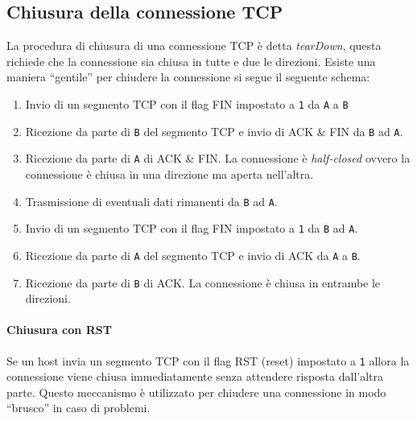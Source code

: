     \subsection[Chiusura della connessione \texttt{TCP}]{Chiusura della connessione \Acrshort*{TCP}}
        La procedura di chiusura di una connessione \Acrshort*{TCP} è detta \textit{tearDown}, questa richiede che la connessione sia chiusa in tutte e due le direzioni. Esiste una maniera ``gentile'' per chiudere la connessione si segue il seguente schema:
        \begin{enumerate}
            \item Invio di un segmento \Acrshort*{TCP} con il flag \Acrshort*{FIN} impostato a \texttt{1} da \texttt{A} a \texttt{B}
            \item Ricezione da parte di \texttt{B} del segmento \Acrshort*{TCP} e invio di \Acrshort*{ACK} \& \Acrshort*{FIN} da \texttt{B} ad \texttt{A}. 
            \item Ricezione da parte di \texttt{A} di \Acrshort*{ACK} \& \Acrshort*{FIN}. La connessione è \textit{half-closed} ovvero la connessione è chiusa in una direzione ma aperta nell'altra.
            \item Trasmissione di eventuali dati rimanenti da \texttt{B} ad \texttt{A}.
            \item Invio di un segmento \Acrshort*{TCP} con il flag \Acrshort*{FIN} impostato a \texttt{1} da \texttt{B} ad \texttt{A}.
            \item Ricezione da parte di \texttt{A} del segmento \Acrshort*{TCP} e invio di \Acrshort*{ACK} da \texttt{A} a \texttt{B}.
            \item Ricezione da parte di \texttt{B} di \Acrshort*{ACK}. La connessione è chiusa in entrambe le direzioni.
        \end{enumerate}
        \paragraph{Chiusura con \Acrshort*{RST}} Se un host invia un segmento \Acrshort*{TCP} con il flag \Acrshort*{RST} (reset) impostato a \texttt{1} allora la connessione viene chiusa immediatamente senza attendere risposta dall'altra parte. Questo meccanismo è utilizzato per chiudere una connessione in modo ``brusco'' in caso di problemi.
